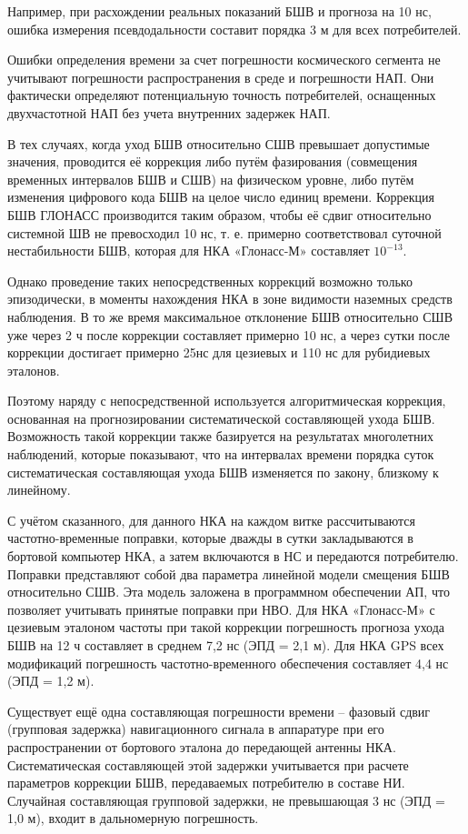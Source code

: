 \documentclass[14pt,a4paper,oneside]{extarticle}
\begin{document}
Например, при расхождении реальных показаний БШВ и прогноза на 10 нс, ошибка измерения псевдодальности составит порядка 3 м для всех потребителей.

Ошибки определения времени за счет погрешности космического сегмента не учитывают погрешности распространения в среде и погрешности НАП. Они фактически определяют потенциальную точность потребителей, оснащенных двухчастотной НАП без учета внутренних задержек НАП.

В тех случаях, когда уход БШВ относительно СШВ превышает допустимые значения, проводится её коррекция либо путём фазирования (совмещения временных интервалов БШВ и СШВ) на физическом уровне, либо путём изменения цифрового кода БШВ на целое число единиц времени. Коррекция БШВ ГЛОНАСС производится таким образом, чтобы её сдвиг относительно системной ШВ не превосходил 10 нс, т. е. примерно соответствовал суточной нестабильности БШВ, которая для НКА «Глонасс-М» составляет $10^{-13}$.

Однако проведение таких непосредственных коррекций возможно только эпизодически, в моменты нахождения НКА в зоне видимости наземных средств наблюдения. В то же время максимальное отклонение БШВ относительно СШВ уже через 2 ч после коррекции составляет примерно 10 нс, а через сутки после коррекции достигает примерно 25нс для цезиевых и 110 нс для рубидиевых эталонов.

Поэтому наряду с непосредственной используется алгоритмическая коррекция, основанная на прогнозировании систематической составляющей ухода БШВ. Возможность такой коррекции также базируется на результатах многолетних наблюдений, которые показывают, что на интервалах времени порядка суток систематическая составляющая ухода БШВ изменяется по закону, близкому к линейному.

С учётом сказанного, для данного НКА на каждом витке рассчитываются частотно-временные поправки, которые дважды в сутки закладываются в бортовой компьютер НКА, а затем включаются в НС и передаются потребителю. Поправки представляют собой два параметра линейной модели смещения БШВ относительно СШВ. Эта модель заложена в программном обеспечении АП, что позволяет учитывать принятые поправки при НВО. Для НКА «Глонасс-М» с цезиевым эталоном частоты при такой коррекции погрешность прогноза ухода БШВ на 12 ч составляет в среднем 7,2 нс (ЭПД = 2,1 м). Для НКА GPS всех модификаций погрешность частотно-временного обеспечения составляет 4,4 нс (ЭПД = 1,2 м).

Существует ещё одна составляющая погрешности времени – фазовый сдвиг (групповая задержка) навигационного сигнала в аппаратуре при его распространении от бортового эталона до передающей антенны НКА. Систематическая составляющей этой задержки учитывается при расчете параметров коррекции БШВ, передаваемых потребителю в составе НИ. Случайная составляющая групповой задержки, не превышающая 3 нс (ЭПД = 1,0 м), входит в дальномерную погрешность.
\end{document}
